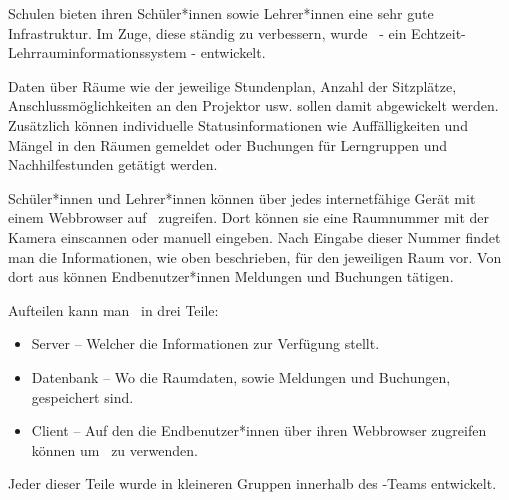 
Schulen bieten ihren Schüler*innen sowie Lehrer*innen eine sehr gute Infrastruktur. Im Zuge, diese ständig zu verbessern, wurde \ZELIA\ - ein Echtzeit-Lehr\-raum\-informations\-system - entwickelt. 

Daten über Räume wie der jeweilige Stundenplan, Anzahl der Sitzplätze, Anschlussmöglichkeiten an den Projektor usw. sollen damit abgewickelt werden. Zusätzlich können individuelle Statusinformationen wie Auffälligkeiten und Mängel in den Räumen gemeldet oder Buchungen für Lerngruppen und Nachhilfestunden getätigt werden.

Schüler*innen und Lehrer*innen können über jedes internetfähige Gerät mit einem Webbrowser auf \ZELIA\ zugreifen. Dort können sie eine Raumnummer mit der Kamera einscannen oder manuell eingeben. Nach Eingabe dieser Nummer findet man die Informationen, wie oben beschrieben, für den jeweiligen Raum vor. Von dort aus können Endbenutzer*innen Meldungen und Buchungen tätigen.

Aufteilen kann man \ZELIA\ in drei Teile:
\begin{itemize}
    \item Server -- Welcher die Informationen zur Verfügung stellt.
    \item Datenbank -- Wo die Raumdaten, sowie Meldungen und Buchungen, gespeichert sind.
    \item Client -- Auf den die Endbenutzer*innen über ihren Webbrowser zugreifen können um \ZELIA\ zu verwenden.
\end{itemize}

Jeder dieser Teile wurde in kleineren Gruppen innerhalb des \ZELIA-Teams entwickelt.
